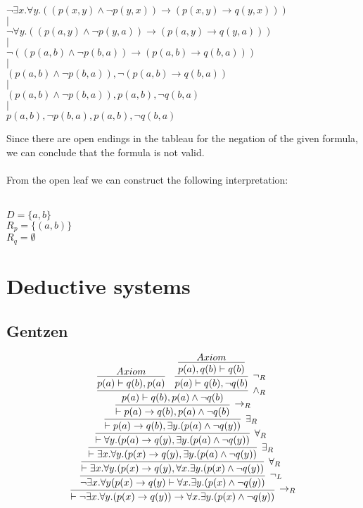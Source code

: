 \documentclass[]{article}
\begin{document}
\begin{center}
$\neg\exists x.\forall y.((p(x,y) \wedge \neg p(y,x))\rightarrow (p(x,y) \rightarrow q(y,x)))$
\\$|$\\
$\neg\forall y.((p(a,y) \wedge \neg p(y,a))\rightarrow (p(a,y) \rightarrow q(y,a)))$
\\$|$\\
$\neg ((p(a,b) \wedge \neg p(b,a))\rightarrow (p(a,b) \rightarrow q(b,a)))$
\\$|$\\
$(p(a,b) \wedge \neg p(b,a)), \neg(p(a,b) \rightarrow q(b,a))
$\\$|$\\
$(p(a,b) \wedge \neg p(b,a)), p(a,b), \neg q(b,a)$
\\$|$\\
$p(a,b), \neg p(b,a), p(a,b), \neg q(b,a)$
\end{center}
\noindent Since there are open endings in the tableau for the negation of the given formula, we can conclude that the formula is not valid.\\
\\
From the open leaf we can construct the following interpretation:\\
\\
\begin{center}
$D = \{a,b\}$\\
$R_p = \{(a,b)\}$\\
$R_q = \emptyset$
\end{center}
\section{Deductive systems}

\subsection{Gentzen}
$$
\infer[\rightarrow_R]{\vdash\neg\exists x.\forall y.(p(x)\rightarrow q(y))\rightarrow\forall x. \exists y.(p(x)\wedge \neg q(y))}{
\infer[\neg_L]{\neg \exists x.\forall y(p(x)\rightarrow q(y)\vdash \forall x.\exists y.(p(x)\wedge \neg q(y))}{
\infer[\forall_R]{\vdash \exists x.\forall y.(p(x)\rightarrow q(y), \forall x.\exists y.(p(x)\wedge \neg q(y))}{
\infer[\exists_R]{\vdash \exists x.\forall y.(p(x)\rightarrow q(y), \exists y.(p(a)\wedge \neg q(y))}{
\infer[\forall_R]{\vdash \forall y.(p(a)\rightarrow q(y), \exists y.(p(a)\wedge \neg q(y))}{
\infer[\exists_R]{\vdash p(a)\rightarrow q(b), \exists y.(p(a)\wedge \neg q(y))}{
\infer[\rightarrow_R]{\vdash p(a)\rightarrow q(b), p(a)\wedge \neg q(b)}{
	\infer[\wedge_R]{p(a)\vdash q(b),p(a)\wedge\neg q(b)}{
		\infer{p(a)\vdash q(b),p(a)}{Axiom}
		&
		\infer[\neg_R]{p(a)\vdash q(b),\neg q(b)}{
			\infer{p(a),q(b)\vdash q(b)}{Axiom}
		}
	}
}
}}}}}}
$$
\end{document}
